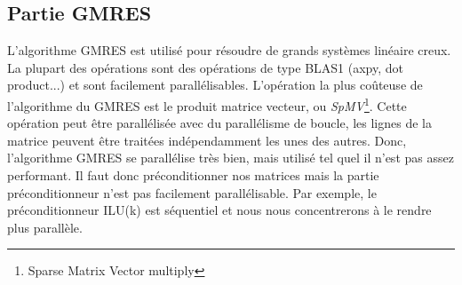 \subsection{Partie GMRES}
L'algorithme GMRES est utilisé pour résoudre de grands systèmes linéaire creux.
%
La plupart des opérations sont des opérations de type BLAS1 (axpy, dot product...) et sont facilement parallélisables.
%
L'opération la plus coûteuse de l'algorithme du GMRES est le produit matrice vecteur, ou {\em SpMV}\footnote{Sparse Matrix Vector multiply}.
%
Cette opération peut être parallélisée avec du parallélisme de boucle, les lignes de la matrice peuvent être traitées indépendamment les unes des autres.
%
Donc, l'algorithme GMRES se parallélise très bien, mais utilisé tel quel il n'est pas assez performant.
%
Il faut donc préconditionner nos matrices mais la partie préconditionneur n'est pas facilement parallélisable.
%
Par exemple, le préconditionneur ILU(k) est séquentiel et nous nous concentrerons à le rendre plus parallèle.



